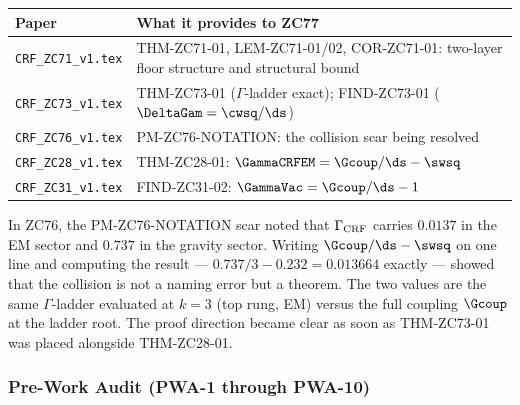 \documentclass[12pt, a4paper]{article}
\begin{document}
\begin{keybox}[title={Companion Papers --- ZC77}]
{\small\renewcommand{\arraystretch}{1.25}
\begin{center}
\begin{tabular}{@{}p{4.5cm}p{8.0cm}@{}}
\toprule
\textbf{Paper} & \textbf{What it provides to ZC77} \\
\midrule
\texttt{CRF\_ZC71\_v1.tex}
  & THM-ZC71-01, LEM-ZC71-01/02, COR-ZC71-01: two-layer floor
    structure and structural bound \\
\texttt{CRF\_ZC73\_v1.tex}
  & THM-ZC73-01 ($\Gamma$-ladder exact);
    FIND-ZC73-01 ($\DeltaGam = \cwsq/\ds$) \\
\texttt{CRF\_ZC76\_v1.tex}
  & PM-ZC76-NOTATION: the collision scar being resolved \\
\texttt{CRF\_ZC28\_v1.tex}
  & THM-ZC28-01: $\GammaCRFEM = \Gcoup/\ds - \swsq$ \\
\texttt{CRF\_ZC31\_v1.tex}
  & FIND-ZC31-02: $\GammaVac = \Gcoup/\ds - 1$ \\
\bottomrule
\end{tabular}
\end{center}}
\end{keybox}

\begin{derivedbox}[title={Discovery Note}]
In ZC76, the PM-ZC76-NOTATION scar noted that $\Gamma_{\rm CRF}$ carries
$0.0137$ in the EM sector and $0.737$ in the gravity sector.
Writing $\Gcoup/\ds - \swsq$ on one line and computing the result
--- $0.737/3 - 0.232 = 0.013664$ exactly --- showed that the collision
is not a naming error but a theorem. The two values are the same
$\Gamma$-ladder evaluated at $k=3$ (top rung, EM) versus the full
coupling $\Gcoup$ at the ladder root. The proof direction became clear
as soon as THM-ZC73-01 was placed alongside THM-ZC28-01.
\end{derivedbox}

\subsubsection{Pre-Work Audit (PWA-1 through PWA-10)}
\end{document}
